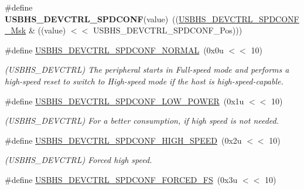 \begin{DoxyCompactItemize}
\#define {\bfseries U\+S\+B\+H\+S\+\_\+\+D\+E\+V\+C\+T\+R\+L\+\_\+\+S\+P\+D\+C\+O\+NF}(value)~((\mbox{\hyperlink{group__SAMV71__USBHS_ga64a383ab4d768e9b4ef6f222682e32e3}{U\+S\+B\+H\+S\+\_\+\+D\+E\+V\+C\+T\+R\+L\+\_\+\+S\+P\+D\+C\+O\+N\+F\+\_\+\+Msk}} \& ((value) $<$$<$ U\+S\+B\+H\+S\+\_\+\+D\+E\+V\+C\+T\+R\+L\+\_\+\+S\+P\+D\+C\+O\+N\+F\+\_\+\+Pos)))
\item 
\mbox{\label{group__SAMV71__USBHS_ga8aeda232c83e31425d34f20b500a0d42}} 
\#define \mbox{\hyperlink{group__SAMV71__USBHS_ga8aeda232c83e31425d34f20b500a0d42}{U\+S\+B\+H\+S\+\_\+\+D\+E\+V\+C\+T\+R\+L\+\_\+\+S\+P\+D\+C\+O\+N\+F\+\_\+\+N\+O\+R\+M\+AL}}~(0x0u $<$$<$ 10)
\begin{DoxyCompactList}\small\item\em (U\+S\+B\+H\+S\+\_\+\+D\+E\+V\+C\+T\+RL) The peripheral starts in Full-\/speed mode and performs a high-\/speed reset to switch to High-\/speed mode if the host is high-\/speed-\/capable. \end{DoxyCompactList}\item 
\mbox{\label{group__SAMV71__USBHS_gab54274fdc81182035ae7a3b747062872}} 
\#define \mbox{\hyperlink{group__SAMV71__USBHS_gab54274fdc81182035ae7a3b747062872}{U\+S\+B\+H\+S\+\_\+\+D\+E\+V\+C\+T\+R\+L\+\_\+\+S\+P\+D\+C\+O\+N\+F\+\_\+\+L\+O\+W\+\_\+\+P\+O\+W\+ER}}~(0x1u $<$$<$ 10)
\begin{DoxyCompactList}\small\item\em (U\+S\+B\+H\+S\+\_\+\+D\+E\+V\+C\+T\+RL) For a better consumption, if high speed is not needed. \end{DoxyCompactList}\item 
\mbox{\label{group__SAMV71__USBHS_ga36fde54725122e91aab3b6aa02b8ead3}} 
\#define \mbox{\hyperlink{group__SAMV71__USBHS_ga36fde54725122e91aab3b6aa02b8ead3}{U\+S\+B\+H\+S\+\_\+\+D\+E\+V\+C\+T\+R\+L\+\_\+\+S\+P\+D\+C\+O\+N\+F\+\_\+\+H\+I\+G\+H\+\_\+\+S\+P\+E\+ED}}~(0x2u $<$$<$ 10)
\begin{DoxyCompactList}\small\item\em (U\+S\+B\+H\+S\+\_\+\+D\+E\+V\+C\+T\+RL) Forced high speed. \end{DoxyCompactList}\item 
\mbox{\label{group__SAMV71__USBHS_gab584d8e60762259d587abf0b0a2750e0}} 
\#define \mbox{\hyperlink{group__SAMV71__USBHS_gab584d8e60762259d587abf0b0a2750e0}{U\+S\+B\+H\+S\+\_\+\+D\+E\+V\+C\+T\+R\+L\+\_\+\+S\+P\+D\+C\+O\+N\+F\+\_\+\+F\+O\+R\+C\+E\+D\+\_\+\+FS}}~(0x3u $<$$<$ 10)
$$
\end{DoxyCompactItemize}
